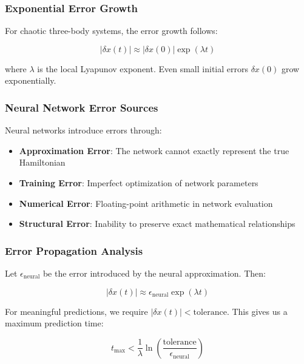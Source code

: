 \documentclass[11pt,a4paper]{article}
\begin{document}
\subsubsection{Exponential Error Growth}

For chaotic three-body systems, the error growth follows:

\begin{equation}
|\delta x(t)| \approx |\delta x(0)| \exp(\lambda t)
\end{equation}

where $\lambda$ is the local Lyapunov exponent. Even small initial errors $\delta x(0)$ grow exponentially.

\subsubsection{Neural Network Error Sources}

Neural networks introduce errors through:

\begin{itemize}
    \item \textbf{Approximation Error}: The network cannot exactly represent the true Hamiltonian
    \item \textbf{Training Error}: Imperfect optimization of network parameters
    \item \textbf{Numerical Error}: Floating-point arithmetic in network evaluation
    \item \textbf{Structural Error}: Inability to preserve exact mathematical relationships
\end{itemize}

\subsubsection{Error Propagation Analysis}

Let $\epsilon_{\text{neural}}$ be the error introduced by the neural approximation. Then:

\begin{equation}
|\delta x(t)| \approx \epsilon_{\text{neural}} \exp(\lambda t)
\end{equation}

For meaningful predictions, we require $|\delta x(t)| < \text{tolerance}$. This gives us a maximum prediction time:

\begin{equation}
t_{\text{max}} < \frac{1}{\lambda} \ln\left(\frac{\text{tolerance}}{\epsilon_{\text{neural}}}\right)
\end{equation}
\end{document}
